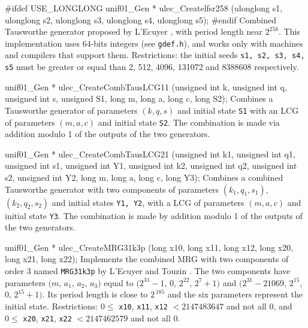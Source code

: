 #ifdef USE_LONGLONG
unif01_Gen * ulec_Createlfsr258 (ulonglong s1, ulonglong s2, ulonglong s3,
                                 ulonglong s4, ulonglong s5);
#endif
\endcode
 \tab Combined Tausworthe generator proposed by L'Ecuyer \cite{rLEC99a},
%
   with period length near $2^{258}$.
   This implementation uses 64-bits integers (see {\tt gdef.h}), 
   and works only with machines and compilers that support them.
 Restrictions: the initial seeds  \texttt{s1, s2, s3, s4, s5}
   must be greater or equal than 2, 512, 4096, 131072 and 8388608 respectively.
 \endtab
\code


unif01_Gen * ulec_CreateCombTausLCG11 (unsigned int k, unsigned  int q, 
                                       unsigned int s, unsigned S1,
                                       long m, long a, long c, long S2);
\endcode
  \tab  Combines a Tausworthe generator of parameters
   $(k, q, s)$ and initial state {\tt S1} with an  LCG
   of parameters $(m, a, c)$ and initial state {\tt S2}.
   The combination is made via addition  modulo 1 of the outputs
   of the two generators.
  \endtab
\code


unif01_Gen * ulec_CreateCombTausLCG21 (unsigned int k1, unsigned int q1,
                                       unsigned int s1, unsigned int Y1, 
                                       unsigned int k2, unsigned int q2,
                                       unsigned int s2, unsigned int Y2, 
                                       long m, long a, long c, long Y3);
\endcode
  \tab  Combines a combined Tausworthe generator with two components
   of parameters
   $(k_1, q_1, s_1)$,  $(k_2, q_2, s_2)$ and initial states
   {\tt Y1, Y2}, with a LCG of parameters
   $(m, a, c)$ and initial state {\tt Y3}.
   The combination is made by addition modulo 1 of the outputs 
   of the two generators.
  \endtab
\code


unif01_Gen * ulec_CreateMRG31k3p (long x10, long x11, long x12,
                                  long x20, long x21, long x22);
\endcode
 \tab  Implements the combined MRG  with two components of order 3
  named {\tt MRG31k3p} by L'Ecuyer and Touzin \cite{rLEC00b}.  
%
  The two components have parameters $(m$, $a_1$, $a_2$, $a_3)$ equal to
  $(2^{31} - 1$, $0$, $2^{22}$, $2^7 +1)$ and
  $(2^{31} - 21069$, $2^{15}$, $0$, $2^{15} +1)$.
  Its period length is close to $2^{\,185}$ and the six parameters
  represent the initial state. Restrictions:
  $0 \le {}$ {\tt x10}, {\tt x11}, {\tt x12} ${} < 2147483647$ and not all 0,
  and $0 \le {}$ {\tt x20}, {\tt x21}, {\tt x22} ${} < 2147462579$
  and not all 0.
 \endtab

